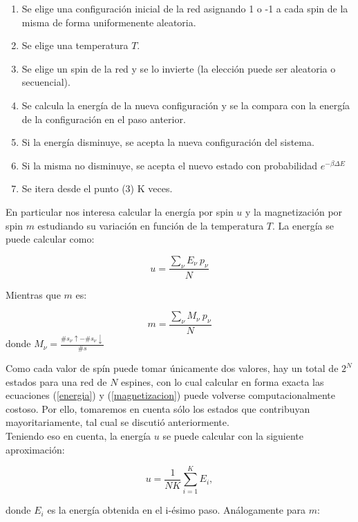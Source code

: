 \documentclass[%
 reprint,
 amsmath,amssymb,
 aps,
spanish]{revtex4-1}
\begin{document}
\begin{enumerate}
\item{Se elige una configuración inicial de la red asignando 1 o -1 a cada spin de la misma de forma uniformenente aleatoria.}
\item{Se elige una temperatura $T$.}
\item{Se elige un spin de la red y se lo invierte (la elección puede ser aleatoria o secuencial).}
\item{Se calcula la energía de la nueva configuración y se la compara con la energía de la configuración en el paso anterior.}
\item{Si la energía disminuye, se acepta la nueva configuración del sistema.}
\item{Si la misma no disminuye, se acepta el nuevo estado con probabilidad $e^{-\beta \Delta E}$}
\item{Se itera desde el punto (3) K veces.}
\end{enumerate}

En particular nos interesa calcular la energía por spin $u$ y la magnetización por spin $m$ estudiando su variación en función de la temperatura $T$.
La energía se puede calcular como:

\begin{equation}
u=\frac{\sum_{\nu}{E_{\nu}\ p_{\nu}}}{N}
\label{energia}
\end{equation}

Mientras que $m$ es:

\begin{equation}
m=\frac{\sum_{\nu}{M_{\nu}\ p_{\nu}}}{N}
\label{magnetizacion}
\end{equation}
donde $M_{\nu}=\frac{\#s_{\nu}\uparrow-\#s_{\nu}\downarrow}{\#s}$

Como cada valor de spín puede tomar únicamente dos valores, hay un total de $2^N$ estados para una red
de $N$ espines, con lo cual calcular en forma exacta las ecuaciones (\ref{energia}) y (\ref{magnetizacion}) puede volverse computacionalmente
costoso. Por ello, tomaremos en cuenta sólo los estados que contribuyan mayoritariamente, tal cual se discutió anteriormente.\\
Teniendo eso en cuenta, la energía $u$ se puede calcular con la siguiente aproximación:

\begin{equation}
u=\frac{1}{NK}\sum_{i=1}^{K}{E_i},
\label{emedia}
\end{equation}

donde $E_i$ es la energía obtenida en el i-ésimo paso.
Análogamente para $m$:
\end{document}
